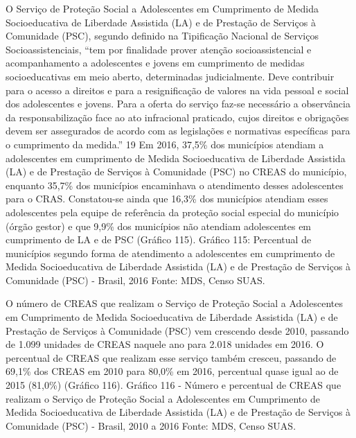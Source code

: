 \documentclass[
  brazilian]{report}
\begin{document}
O Serviço de Proteção Social a Adolescentes em Cumprimento de Medida
Socioeducativa de Liberdade Assistida (LA) e de Prestação de Serviços à
Comunidade (PSC), segundo definido na Tipificação Nacional de Serviços
Socioassistenciais, ``tem por finalidade prover atenção
socioassistencial e acompanhamento a adolescentes e jovens em
cumprimento de medidas socioeducativas em meio aberto, determinadas
judicialmente. Deve contribuir para o acesso a direitos e para a
resignificação de valores na vida pessoal e social dos adolescentes e
jovens. Para a oferta do serviço faz-se necessário a observância da
responsabilização face ao ato infracional praticado, cujos direitos e
obrigações devem ser assegurados de acordo com as legislações e
normativas específicas para o cumprimento da medida.'' 19 Em 2016,
37,5\% dos municípios atendiam a adolescentes em cumprimento de Medida
Socioeducativa de Liberdade Assistida (LA) e de Prestação de Serviços à
Comunidade (PSC) no CREAS do município, enquanto 35,7\% dos municípios
encaminhava o atendimento desses adolescentes para o CRAS. Constatou-se
ainda que 16,3\% dos municípios atendiam esses adolescentes pela equipe
de referência da proteção social especial do município (órgão gestor) e
que 9,9\% dos municípios não atendiam adolescentes em cumprimento de LA
e de PSC (Gráfico 115). Gráfico 115: Percentual de municípios segundo
forma de atendimento a adolescentes em cumprimento de Medida
Socioeducativa de Liberdade Assistida (LA) e de Prestação de Serviços à
Comunidade (PSC) - Brasil, 2016 Fonte: MDS, Censo SUAS.

O número de CREAS que realizam o Serviço de Proteção Social a
Adolescentes em Cumprimento de Medida Socioeducativa de Liberdade
Assistida (LA) e de Prestação de Serviços à Comunidade (PSC) vem
crescendo desde 2010, passando de 1.099 unidades de CREAS naquele ano
para 2.018 unidades em 2016. O percentual de CREAS que realizam esse
serviço também cresceu, passando de 69,1\% dos CREAS em 2010 para 80,0\%
em 2016, percentual quase igual ao de 2015 (81,0\%) (Gráfico 116).
Gráfico 116 - Número e percentual de CREAS que realizam o Serviço de
Proteção Social a Adolescentes em Cumprimento de Medida Socioeducativa
de Liberdade Assistida (LA) e de Prestação de Serviços à Comunidade
(PSC) - Brasil, 2010 a 2016 Fonte: MDS, Censo SUAS.
\end{document}
